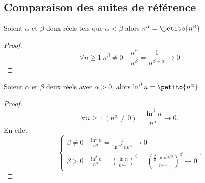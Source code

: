 \subsection{Comparaison des suites de référence}

\begin{prop}
  Soient $\alpha$ et $\beta$ deux réels tels que $\alpha < \beta$ alors $n^\alpha = \petito{n^\beta}$
\end{prop}
\begin{proof}
  \begin{equation}
    \forall n \geq 1 \ n^\beta \neq 0 \quad \frac{n^\alpha}{n^\beta}=\frac{1}{n^{\beta-\alpha}} \rightarrow 0
  \end{equation}
\end{proof}

\begin{prop}
  Soient $\alpha$ et $\beta$ deux réels avec $\alpha>0$, alors $\ln^\beta n = \petito{n^\alpha}$
\end{prop}
\begin{proof}
  \begin{equation}
    \forall n \geq 1 \ (n^\alpha \neq 0) \quad \frac{\ln^\beta n}{n^\alpha} \rightarrow 0.
  \end{equation}
En effet
\begin{equation}
  \begin{cases}
    \beta \neq 0 & \frac{\ln^\beta n}{n^\alpha}=\frac{1}{\ln^{-\beta} n n^\alpha} \rightarrow 0 \\
    \beta > 0 & \frac{\ln^\beta n}{n^\alpha} = \left(\frac{\ln n}{n^{\frac{\alpha}{beta}}}\right)^\beta = \left(\frac{\frac{\beta}{\alpha}\ln n^{\alpha/\beta}}{n^{\frac{\alpha}{beta}}}\right)^\beta \rightarrow 0
  \end{cases}.
\end{equation}
\end{proof}

